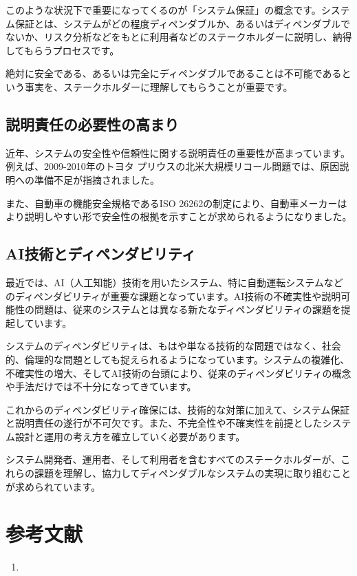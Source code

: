 このような状況下で重要になってくるのが「システム保証」の概念です。システム保証とは、システムがどの程度ディペンダブルか、あるいはディペンダブルでないか、リスク分析などをもとに利用者などのステークホルダーに説明し、納得してもらうプロセスです。

絶対に安全である、あるいは完全にディペンダブルであることは不可能であるという事実を、ステークホルダーに理解してもらうことが重要です。

\subsection{説明責任の必要性の高まり}

近年、システムの安全性や信頼性に関する説明責任の重要性が高まっています。例えば、2009-2010年のトヨタ プリウスの北米大規模リコール問題では、原因説明への準備不足が指摘されました。

また、自動車の機能安全規格であるISO 26262の制定により、自動車メーカーはより説明しやすい形で安全性の根拠を示すことが求められるようになりました。

\subsection{AI技術とディペンダビリティ}

最近では、AI（人工知能）技術を用いたシステム、特に自動運転システムなどのディペンダビリティが重要な課題となっています。AI技術の不確実性や説明可能性の問題は、従来のシステムとは異なる新たなディペンダビリティの課題を提起しています。


システムのディペンダビリティは、もはや単なる技術的な問題ではなく、社会的、倫理的な問題としても捉えられるようになっています。システムの複雑化、不確実性の増大、そしてAI技術の台頭により、従来のディペンダビリティの概念や手法だけでは不十分になってきています。

これからのディペンダビリティ確保には、技術的な対策に加えて、システム保証と説明責任の遂行が不可欠です。また、不完全性や不確実性を前提としたシステム設計と運用の考え方を確立していく必要があります。

システム開発者、運用者、そして利用者を含むすべてのステークホルダーが、これらの課題を理解し、協力してディペンダブルなシステムの実現に取り組むことが求められています。

\section*{参考文献}
\begin{enumerate}
\item 
\end{enumerate}

